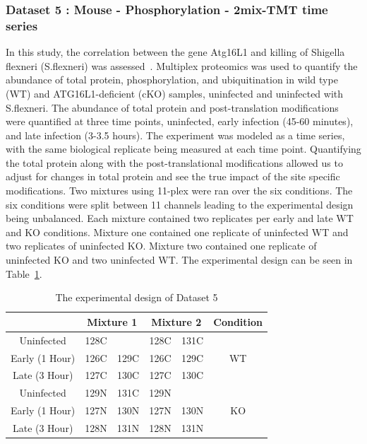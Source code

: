 \documentclass{mcp}
\begin{document}
\clearpage
\subsubsection{Dataset 5 : Mouse - Phosphorylation - 2mix-TMT time series}
\label{sec:shigella}

In this study, the correlation between the gene Atg16L1 and killing of Shigella flexneri (S.flexneri) was assessed~\cite{Maculins}. Multiplex proteomics was used to quantify the abundance of total protein, phosphorylation, and ubiquitination in wild type (WT) and ATG16L1-deficient (cKO) samples, uninfected and uninfected with S.flexneri. The abundance of total protein and post-translation modifications were quantified at three time points, uninfected, early infection (45-60 minutes), and late infection (3-3.5 hours). The experiment was modeled as a time series, with the same biological replicate being measured at each time point. Quantifying the total protein along with the post-translational modifications allowed us to adjust for changes in total protein and see the true impact of the site specific modifications. Two mixtures using 11-plex were ran over the six conditions. The six conditions were split between 11 channels leading to the experimental design being unbalanced. Each mixture contained two replicates per early and late WT and KO conditions. Mixture one contained one replicate of uninfected WT and two replicates of uninfected KO. Mixture two contained one replicate of uninfected KO and two uninfected WT. The experimental design can be seen in Table~\ref{table:shigella_design}.

\begin{table}[h!]
\centering
\begin{tabular}{|c | c c | c c | c|}
\hline
 & \multicolumn{2}{c}{Mixture 1} & \multicolumn{2}{c}{Mixture 2} & Condition \\ [0.5ex]
 \hline\hline
 Uninfected & 128C & & 128C & 131C & \\
 \hline
Early (1 Hour) & 126C & 129C & 126C & 129C & WT \\
\hline
Late (3 Hour) & 127C & 130C & 127C & 130C & \\
\hline
Uninfected & 129N & 131C & 129N & & \\
\hline
Early (1 Hour) & 127N & 130N & 127N & 130N & KO \\
\hline
Late (3 Hour) & 128N & 131N & 128N & 131N & \\
\hline

\end{tabular}
\caption{The experimental design of Dataset 5}
\label{table:shigella_design}
\end{table}
\end{document}
